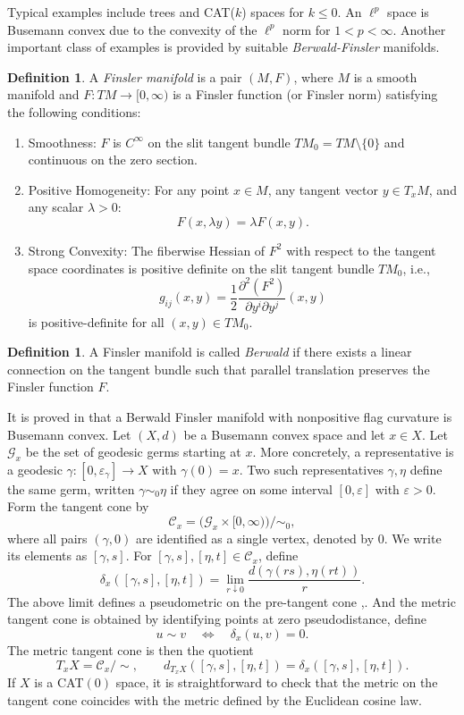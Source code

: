 \documentclass{article}
\theoremstyle{plain}
\theoremstyle{definition}
\newtheorem{definition}[theorem]{Definition}
\theoremstyle{remark}
\begin{document}
	Typical examples include trees and CAT($k$) spaces for $k\leq 0$. An $\ell^p$ space is Busemann convex due to the convexity of the $\ell^p$ norm for \(1<p<\infty\). Another important class of examples is provided by suitable \emph{Berwald-Finsler} manifolds.
	\begin{definition}
		A \emph{Finsler manifold} is a pair $(M, F)$, where $M$ is a smooth manifold and $F: TM \to [0, \infty)$ is a Finsler function (or Finsler norm) satisfying the following conditions:
		\begin{enumerate}
			\item Smoothness: $F$ is $C^\infty$ on the slit tangent bundle $TM_0 = TM \setminus \{0\}$ and continuous on the zero section.
			\item Positive Homogeneity: For any point $x \in M$, any tangent vector $y \in T_x M$, and any scalar $\lambda > 0$: $$F(x, \lambda y) = \lambda F(x, y).$$
			\item Strong Convexity: The fiberwise Hessian of \(F^2\) with respect to the tangent space coordinates is positive definite on the slit tangent bundle $TM_0$, i.e., 
			$$g_{ij}(x, y) = \frac{1}{2} \frac{\partial^2 (F^2)}{\partial y^i \partial y^j}(x, y)$$ is positive-definite for all $(x, y) \in TM_0$.
		\end{enumerate}
	\end{definition}
	
	\begin{definition}
		A Finsler manifold is called \emph{Berwald} if there exists a linear connection on the tangent bundle such that parallel translation preserves the Finsler function $F$.
	\end{definition}
	It is proved in \cite{KRISTALY20061257} that a Berwald Finsler manifold with nonpositive flag curvature is Busemann convex. Let $(X,d)$ be a Busemann convex space and let $x\in X$. Let $\mathcal G_x$ be the set of geodesic germs starting at $x$. More concretely, a representative is a geodesic $\gamma:[0,\varepsilon_\gamma]\to X$ with $\gamma(0)=x$. Two such representatives $\gamma,\eta$ define the same germ, written $\gamma\sim_0\eta$ if they agree on some interval $[0,\varepsilon]$ with $\varepsilon>0$. Form the tangent cone by 
	$$
	\mathcal C_x=\bigl(\mathcal G_x\times[0,\infty)\bigr)/\sim_0,
	$$
	where all pairs $(\gamma,0)$ are identified as a single vertex, denoted by $0$. We write its elements as $[\gamma,s]$. For $[\gamma,s],[\eta,t]\in\mathcal C_x$, define
	$$
	\delta_x([\gamma,s],[\eta,t])=\lim_{r\downarrow0}\frac{d(\gamma(rs),\eta(rt))}{r}.
	$$
	The above limit defines a pseudometric on the pre-tangent cone \cite{bridson2013metric},\cite{GigliNobili2021}. And the metric tangent cone is obtained by identifying points at zero pseudodistance, define
	$$
	u\sim v
	\quad\Longleftrightarrow\quad
	\delta_x(u,v)=0.
	$$
	The metric tangent cone is then the quotient
	$$T_xX=\mathcal C_x/{\sim},\qquad d_{T_xX}([\gamma,s],[\eta,t])=\delta_x([\gamma,s],[\eta,t]).$$
	If $X$ is a CAT$(0)$ space, it is straightforward to check that the metric on the tangent cone coincides with the metric defined by the Euclidean cosine law.
	
\end{document}
